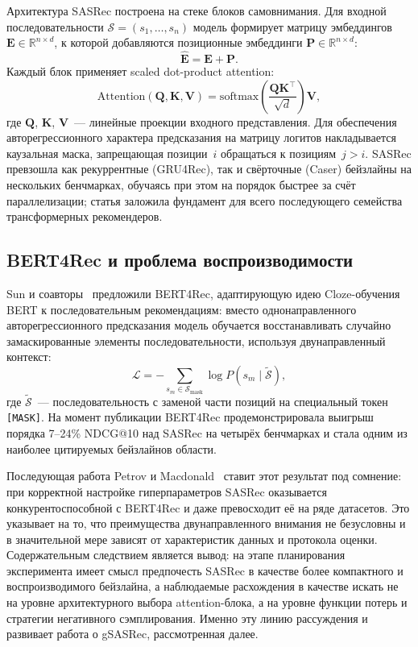 Архитектура SASRec построена на стеке блоков самовнимания. Для входной последовательности $\mathcal{S} = (s_1, \ldots, s_n)$ модель формирует матрицу эмбеддингов $\mathbf{E} \in \mathbb{R}^{n \times d}$, к которой добавляются позиционные эмбеддинги $\mathbf{P} \in \mathbb{R}^{n \times d}$:
\begin{equation*}
    \hat{\mathbf{E}} = \mathbf{E} + \mathbf{P}.
\end{equation*}
Каждый блок применяет scaled dot-product attention:
\begin{equation*}
    \mathrm{Attention}(\mathbf{Q}, \mathbf{K}, \mathbf{V}) = \mathrm{softmax}\!\left(\frac{\mathbf{Q}\mathbf{K}^\top}{\sqrt{d}}\right)\mathbf{V},
\end{equation*}
где $\mathbf{Q}$, $\mathbf{K}$, $\mathbf{V}$~--- линейные проекции входного представления. Для обеспечения авторегрессионного характера предсказания на матрицу логитов накладывается каузальная маска, запрещающая позиции~$i$ обращаться к позициям~$j > i$. SASRec превзошла как рекуррентные (GRU4Rec), так и свёрточные (Caser) бейзлайны на нескольких бенчмарках, обучаясь при этом на порядок быстрее за счёт параллелизации; статья заложила фундамент для всего последующего семейства трансформерных рекомендеров.

\subsection{BERT4Rec и проблема воспроизводимости}
\label{subsec:ch1:bert4rec}

Sun и соавторы~\cite{bert4rec2019} предложили BERT4Rec, адаптирующую идею Cloze-обучения BERT к последовательным рекомендациям: вместо однонаправленного авторегрессионного предсказания модель обучается восстанавливать случайно замаскированные элементы последовательности, используя двунаправленный контекст:
\begin{equation*}
    \mathcal{L} = -\sum_{s_m \in \mathcal{S}_{\mathrm{mask}}} \log P(s_m \mid \tilde{\mathcal{S}}),
\end{equation*}
где $\tilde{\mathcal{S}}$~--- последовательность с заменой части позиций на специальный токен \texttt{[MASK]}. На момент публикации BERT4Rec продемонстрировала выигрыш порядка 7--24\% NDCG@10 над SASRec на четырёх бенчмарках и стала одним из наиболее цитируемых бейзлайнов области.

Последующая работа Petrov и Macdonald~\cite{petrov2022bert4rec_replicability} ставит этот результат под сомнение: при корректной настройке гиперпараметров SASRec оказывается конкурентоспособной с BERT4Rec и даже превосходит её на ряде датасетов. Это указывает на то, что преимущества двунаправленного внимания не безусловны и в значительной мере зависят от характеристик данных и протокола оценки. Содержательным следствием является вывод: на этапе планирования эксперимента имеет смысл предпочесть SASRec в качестве более компактного и воспроизводимого бейзлайна, а наблюдаемые расхождения в качестве искать не на уровне архитектурного выбора attention-блока, а на уровне функции потерь и стратегии негативного сэмплирования. Именно эту линию рассуждения и развивает работа о gSASRec, рассмотренная далее.

